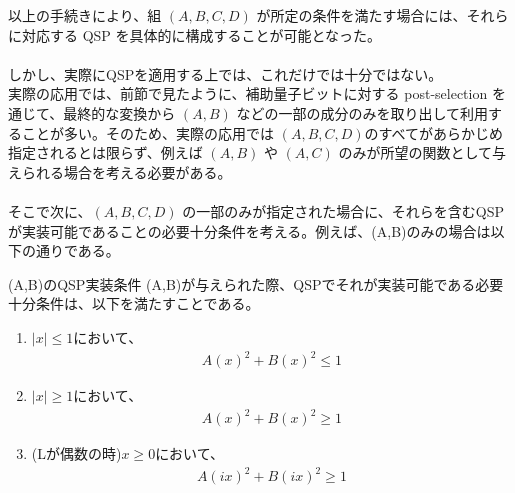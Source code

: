 \documentclass[a4paper,10.5pt]{article}
\numberwithin{equation}{section}
\begin{document}
以上の手続きにより、組 $(A,B,C,D)$ が所定の条件を満たす場合には、それらに対応する QSP を具体的に構成することが可能となった。\\
\\
しかし、実際にQSPを適用する上では、これだけでは十分ではない。\\
実際の応用では、前節で見たように、補助量子ビットに対する post-selection を通じて、最終的な変換から $(A,B)$ などの一部の成分のみを取り出して利用することが多い。そのため、実際の応用では $(A,B,C,D)$のすべてがあらかじめ指定されるとは限らず、例えば $(A,B)$ や $(A,C)$ のみが所望の関数として与えられる場合を考える必要がある。\\
\\
そこで次に、$(A,B,C,D)$ の一部のみが指定された場合に、それらを含むQSPが実装可能であることの必要十分条件を考える。例えば、(A,B)のみの場合は以下の通りである。
\begin{resultbox}{(A,B)のQSP実装条件}
    (A,B)が与えられた際、QSPでそれが実装可能である必要十分条件は、以下を満たすことである。
    \begin{enumerate}
        \item $|x|\leq 1$において、
        \begin{align*}
            A(x)^{2}+B(x)^{2}\leq 1
        \end{align*}
        \item $|x|\geq 1$において、
        \begin{align*}
            A(x)^{2}+B(x)^{2}\geq 1
        \end{align*}
        \item (Lが偶数の時)$x\geq 0$において、
        \begin{align*}
            A(ix)^{2}+B(ix)^{2}\geq 1
        \end{align*}
    \end{enumerate}
\end{resultbox}
\end{document}
